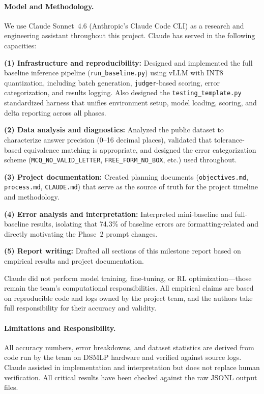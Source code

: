 \documentclass{article}
\begin{document}
\paragraph{Model and Methodology.}
We use Claude Sonnet~4.6 (Anthropic's Claude Code CLI) as a research and engineering assistant throughout this project. Claude has served in the following capacities:

\textbf{(1) Infrastructure and reproducibility:} Designed and implemented the full baseline inference pipeline (\texttt{run\_baseline.py}) using vLLM with INT8 quantization, including batch generation, \texttt{judger}-based scoring, error categorization, and results logging. Also designed the \texttt{testing\_template.py} standardized harness that unifies environment setup, model loading, scoring, and delta reporting across all phases.

\textbf{(2) Data analysis and diagnostics:} Analyzed the public dataset to characterize answer precision (0--16 decimal places), validated that tolerance-based equivalence matching is appropriate, and designed the error categorization scheme (\texttt{MCQ\_NO\_VALID\_LETTER}, \texttt{FREE\_FORM\_NO\_BOX}, etc.) used throughout.

\textbf{(3) Project documentation:} Created planning documents (\texttt{objectives.md}, \texttt{process.md}, \texttt{CLAUDE.md}) that serve as the source of truth for the project timeline and methodology.

\textbf{(4) Error analysis and interpretation:} Interpreted mini-baseline and full-baseline results, isolating that 74.3\% of baseline errors are formatting-related and directly motivating the Phase~2 prompt changes.

\textbf{(5) Report writing:} Drafted all sections of this milestone report based on empirical results and project documentation.

Claude did not perform model training, fine-tuning, or RL optimization—those remain the team's computational responsibilities. All empirical claims are based on reproducible code and logs owned by the project team, and the authors take full responsibility for their accuracy and validity.

\paragraph{Limitations and Responsibility.}
All accuracy numbers, error breakdowns, and dataset statistics are derived from code run by the team on DSMLP hardware and verified against source logs. Claude assisted in implementation and interpretation but does not replace human verification. All critical results have been checked against the raw JSONL output files.





\end{document}
